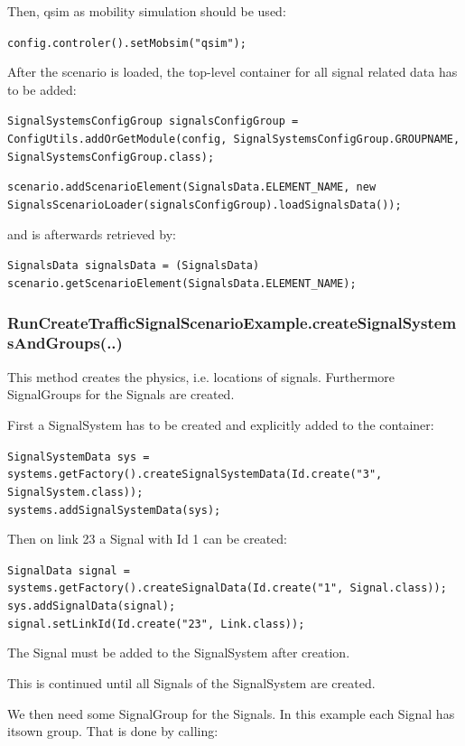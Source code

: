 Then, qsim as mobility simulation should be used:


\texttt{\nolinebreak config.controler().setMobsim("qsim"); \nolinebreak }


After the scenario is loaded, the top-level container for all signal related data has to be added: 


\texttt{\nolinebreak SignalSystemsConfigGroup signalsConfigGroup = ConfigUtils.addOrGetModule(config, SignalSystemsConfigGroup.GROUPNAME, SignalSystemsConfigGroup.class);}

\texttt{\nolinebreak scenario.addScenarioElement(SignalsData.ELEMENT\_NAME, new SignalsScenarioLoader(signalsConfigGroup).loadSignalsData());}

and is afterwards retrieved by: 

\texttt{\nolinebreak SignalsData signalsData = (SignalsData) scenario.getScenarioElement(SignalsData.ELEMENT\_NAME);}

\subsubsection{RunCreateTrafficSignalScenarioExample.createSignalSystemsAndGroups(..)}

This method creates the physics, i.e. locations of signals. Furthermore SignalGroups for the Signals are created.

First a SignalSystem has to be created and explicitly added to the container:


\texttt{\nolinebreak SignalSystemData sys = systems.getFactory().createSignalSystemData(Id.create("3", SignalSystem.class));
\\  \nolinebreak systems.addSignalSystemData(sys);}

Then on link 23 a Signal with Id 1 can be created:


\texttt{\nolinebreak SignalData signal = systems.getFactory().createSignalData(Id.create("1", Signal.class));
\\\nolinebreak sys.addSignalData(signal);
\\\nolinebreak signal.setLinkId(Id.create("23", Link.class));}

The Signal must be added to the SignalSystem after creation.

This is continued until all Signals of the SignalSystem are created.

We then need some SignalGroup for the Signals. In this example each Signal has its\nolinebreak own group. That is done by calling:


